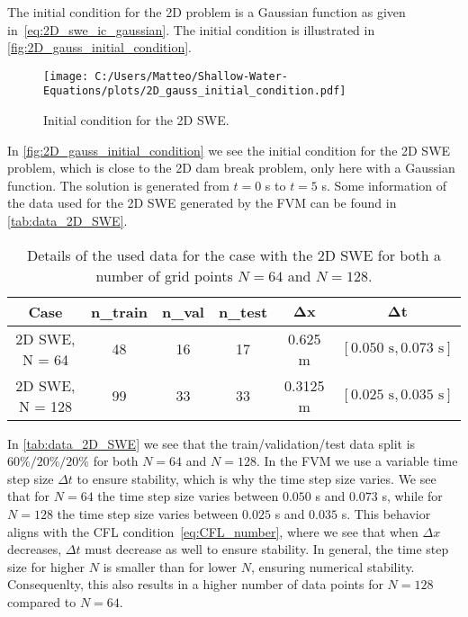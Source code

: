 The initial condition for the 2D problem is a Gaussian function as given in~\eqref{eq:2D_swe_ic_gaussian}.
The initial condition is illustrated in \autoref{fig:2D_gauss_initial_condition}.
\begin{figure}[H]
    \centering
    \texttt{[image: C:/Users/Matteo/Shallow-Water-Equations/plots/2D\_gauss\_initial\_condition.pdf]}
    \caption{Initial condition for the 2D SWE.}\label{fig:2D_gauss_initial_condition}
\end{figure}
In \autoref{fig:2D_gauss_initial_condition} we see the initial condition for the 2D SWE problem, which is close to the 2D dam break problem, only here with a Gaussian function.
The solution is generated from $t = 0$ s to $t = 5$ s.
Some information of the data used for the 2D SWE generated by the FVM can be found in \autoref{tab:data_2D_SWE}.
\begin{table}[H]
    \centering
    \begin{tabular}{c|ccccc}
        \textbf{Case} & \textbf{n\_train} & \textbf{n\_val} & \textbf{n\_test} & $\mathbf{\Delta x}$ & $\mathbf{\Delta t}$ \\
        \hline
        2D SWE, N = 64 & 48 & 16 & 17 & 0.625 m  & $[0.050 \text{ s}, 0.073 \text{ s}]$ \\
        2D SWE, N = 128 & 99 & 33 & 33 & 0.3125 m  & $[0.025 \text{ s}, 0.035 \text{ s}]$ \\
    \end{tabular}
    \caption{Details of the used data for the case with the 2D SWE for both a number of grid points $N=64$ and $N=128$.}\label{tab:data_2D_SWE}
\end{table}
In \autoref{tab:data_2D_SWE} we see that the train/validation/test data split is $60\%/20\%/20\%$ for both $N = 64$ and $N = 128$.
In the FVM we use a variable time step size $\Delta t$ to ensure stability, which is why the time step size varies.
We see that for $N = 64$ the time step size varies between $0.050$ s and $0.073$ s, while for $N = 128$ the time step size varies between $0.025$ s and $0.035$ s.
This behavior aligns with the CFL condition~\eqref{eq:CFL_number}, where we see that when $\Delta x$ decreases, $\Delta t$ must decrease as well to ensure stability.
In general, the time step size for higher $N$ is smaller than for lower $N$, ensuring numerical stability.
Consequenlty, this also results in a higher number of data points for $N = 128$ compared to $N = 64$.

